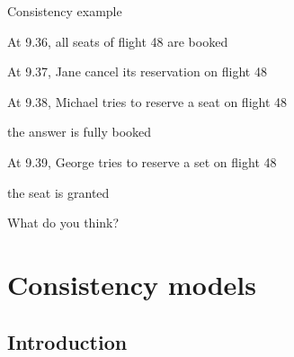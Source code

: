 \begin{frame}{Consistency example}
	
\begin{example}
\BI
\item  At 9.36, all seats of flight 48 are booked
\item  At 9.37, Jane cancel its reservation on flight 48
\item  At 9.38, Michael tries to reserve a seat on flight 48
	\BI
	\item the answer is fully booked
	\EI
\item  At 9.39, George tries to reserve a set on flight 48
	\BI
	\item the seat is granted
	\EI
\EI
\end{example}	

\bigskip
What do you think?

\end{frame}


\section{Consistency models}

\subsection{Introduction}

